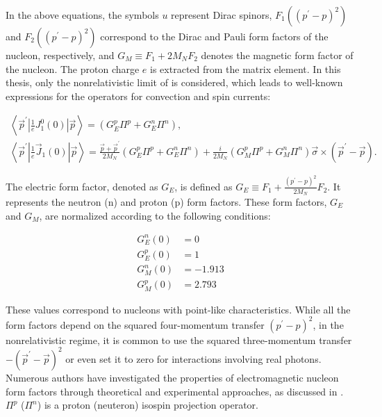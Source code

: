     In the above equations, the symbols $u$ represent Dirac spinors, $F_1\left(\left(p^{\prime}-p\right)^2\right)$ and $F_2\left(\left(p^{\prime}-p\right)^2\right)$ correspond to the Dirac and Pauli form factors of the nucleon, respectively, and $G_M \equiv F_1+2 M_N F_2$ denotes the magnetic form factor of the nucleon. The proton charge $e$ is extracted from the matrix element. In this thesis, only the nonrelativistic limit of  is considered, which leads to well-known expressions for the operators for convection and spin currents:


    \begin{equation}
        \begin{array}{r}
            \left\langle\vec{p}^{\prime}\left|\frac{1}{e} J_1^0(0)\right| \vec{p}\right\rangle=\left(G_E^p \Pi^p+G_E^n \Pi^n\right), \\
            \left\langle\vec{p}^{\prime}\left|\frac{1}{e} \vec{J}_1(0)\right| \vec{p}\right\rangle=\frac{\vec{p}+\vec{p}^{\prime}}{2 M_N}\left(G_E^p \Pi^p+G_E^n \Pi^n\right)+\frac{i}{2 M_N}\left(G_M^p \Pi^p+G_M^n \Pi^n\right) \vec{\sigma} \times\left(\vec{p}^{\prime}-\vec{p}\right) .
        \end{array}
    \end{equation}

    The electric form factor, denoted as $G_E$, is defined as $G_E \equiv F_1+\frac{\left(p^{\prime}-p\right)^2}{2 M_N} F_2$. It represents the neutron (n) and proton (p) form factors. These form factors, $G_E$ and $G_M$, are normalized according to the following conditions:

    \begin{equation}
        \begin{aligned}
        G_E^n(0) & =0 \\
        G_E^p(0) & =1 \\
        G_M^n(0) & =-1.913 \\
        G_M^p(0) & =2.793
        \end{aligned}
    \end{equation}

    These values correspond to nucleons with point-like characteristics. While all the form factors depend on the squared
    four-momentum transfer $\left(p^{\prime}-p\right)^2$, in the nonrelativistic regime, it is common to use the squared
    three-momentum transfer $-\left(\vec{p}^{\prime}-\vec{p}\right)^2$ or even set it to zero for interactions involving
    real photons. Numerous authors have investigated the properties of electromagnetic nucleon form factors through
    theoretical and experimental approaches, as discussed in \cite{Arrington_2007, JOURDAN1999513c}.
    $\Pi^p$ ($\Pi^n$) is a proton (neuteron) isospin projection operator.

